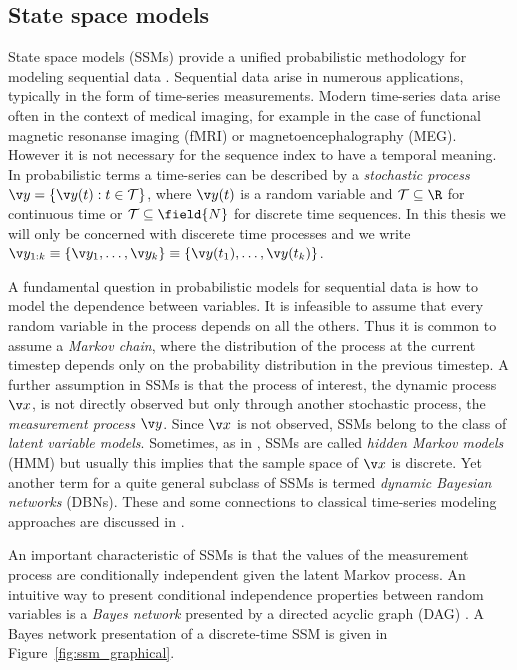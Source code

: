 \subsection{State space models}

State space models (SSMs) provide a unified probabilistic methodology for modeling
sequential data \parencite{ljung1994modeling,durbin2012time,Cappe2005,barber2011bayesian}. Sequential data arise in numerous applications, 
typically in the form of time-series measurements. Modern time-series data arise often in the context of medical imaging,
for example in the case of functional magnetic resonanse imaging (fMRI) or magnetoencephalography (MEG).
However it is not necessary for the sequence index to have
a temporal meaning. In probabilistic terms a time-series
can be described by a \emph{stochastic process} $\y = \left\{\y(t): t\in \mathcal{T}\right\}$, 
where $\y(t)$ is a random variable and $\mathcal{T}\subseteq\R$ for continuous time or 
$\mathcal{T}\subseteq\field{N}$ for discrete time sequences.
In this thesis we will only be concerned with discerete time processes 
and we write $\y_{1:k}\equiv\{\y_1,\dots,\y_k\}\equiv\{\y(t_1),\dots,\y(t_k)\}$.

A fundamental question in probabilistic models for sequential data is how 
to model the dependence between variables. It is infeasible to assume
that every random variable in the process depends on all the others.
Thus it is common to assume a \emph{Markov chain}, where the distribution of
the process at the current timestep depends only on the probability distribution in the previous timestep.
A further assumption in SSMs is that the process of interest, the dynamic process $\x$, is not directly observed
but only through another stochastic process, the \emph{measurement process} $\y$. Since
$\x$ is not observed, SSMs belong to the class of \emph{latent variable models}. Sometimes, as in
\textcite{Cappe2005}, SSMs are called \emph{hidden Markov models} (HMM) but usually this implies that
the sample space of $\x$ is discrete. Yet another term for a quite general subclass
of SSMs is termed \emph{dynamic Bayesian networks} (DBNs). These and some connections
to classical time-series modeling approaches are discussed in \textcite{Murphy2002}. 

An important characteristic of SSMs is that the values of the measurement process are conditionally independent
given the latent Markov process. An intuitive way to present conditional 
independence properties between random variables is a \emph{Bayes network} 
presented by a directed acyclic graph (DAG) \parencite{pearl1988probabilistic,Bishop2006}.
A Bayes network presentation of a discrete-time SSM is given in Figure~\ref{fig:ssm_graphical}.

